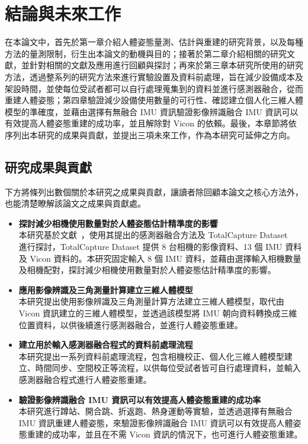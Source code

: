 \chapter{結論與未來工作}
\fontsize{12pt}{18pt}\selectfont

在本論文中，首先於第一章介紹人體姿態量測、估計與重建的研究背景，以及每種方法的量測限制，衍生出本論文的動機與目的；接著於第二章介紹相關的研究文獻，並針對相關的文獻及應用進行回顧與探討；再來於第三章本研究所使用的研究方法，透過整系列的研究方法來進行實驗設置及資料前處理，旨在減少設備成本及架設時間，並使每位受試者都可以自行處理蒐集到的資料並進行感測器融合，從而重建人體姿態；第四章驗證減少設備使用數量的可行性、確認建立個人化三維人體模型的準確度，並藉由選擇有無融合 IMU 資訊驗證影像辨識融合 IMU 資訊可以有效提高人體姿態重建的成功率，並且解除對 Vicon 的依賴。最後，本章節將依序列出本研究的成果與貢獻，並提出三項未來工作，作為本研究可延伸之方向。

\section{研究成果與貢獻}
下方將條列出數個關於本研究之成果與貢獻，讓讀者除回顧本論文之核心方法外，也能清楚瞭解該論文之成果與貢獻處。

\begin{itemize}
    \item \textbf{探討減少相機使用數量對於人體姿態估計精準度的影響}
    \\ 本研究基於文獻~\cite{Zhang_2020_CVPR}，使用其提出的感測器融合方法及 TotalCapture Dataset ~\cite{Trumble:BMVC:2017} 進行探討，TotalCapture Dataset 提供 8 台相機的影像資料、13 個 IMU 資料及 Vicon 資料的。本研究固定輸入 8 個 IMU 資料，並藉由選擇輸入相機數量及相機配對，探討減少相機使用數量對於人體姿態估計精準度的影響。
    \clearpage
    \item \textbf{應用影像辨識及三角測量計算建立三維人體模型}
    \\ 本研究提出使用影像辨識及三角測量計算方法建立三維人體模型，取代由 Vicon 資訊建立的三維人體模型，並透過該模型將 IMU 朝向資料轉換成三維位置資料，以供後續進行感測器融合，並進行人體姿態重建。
    \item \textbf{建立用於輸入感測器融合程式的資料前處理流程}
    \\ 本研究提出一系列資料前處理流程，包含相機校正、個人化三維人體模型建立、時間同步、空間校正等流程，以供每位受試者皆可自行處理資料，並輸入感測器融合程式進行人體姿態重建。
    \item \textbf{驗證影像辨識融合 IMU 資訊可以有效提高人體姿態重建的成功率}
    \\ 本研究進行蹲站、開合跳、折返跑、熱身運動等實驗，並透過選擇有無融合 IMU 資訊重建人體姿態，來驗證影像辨識融合 IMU 資訊可以有效提高人體姿態重建的成功率，並且在不需 Vicon 資訊的情況下，也可進行人體姿態重建。
\end{itemize}

